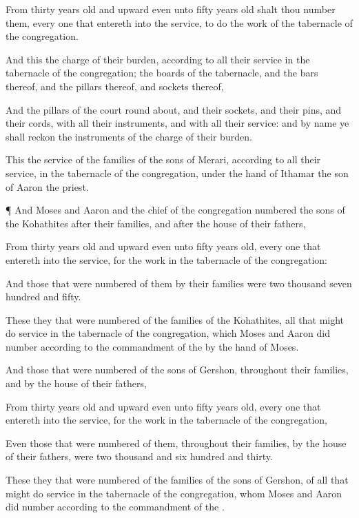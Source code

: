 {From
thirty
years
old and
upward even unto
fifty
years
old shalt thou
number them, every one that
entereth into the
service, to
do the
work of the
tabernacle of the
congregation.

And this
{} the
charge of their
burden, according to all their
service in the
tabernacle of the
congregation; the
boards of the
tabernacle, and the
bars thereof, and the
pillars thereof, and
sockets thereof,

And the
pillars of the
court round
about, and their
sockets, and their
pins, and their
cords, with all their
instruments, and with all their
service: and by
name ye shall
reckon the
instruments of the
charge of their
burden.

This
{} the
service of the
families of the
sons of
Merari, according to all their
service, in the
tabernacle of the
congregation, under the
hand of
Ithamar the
son of
Aaron the
priest.


\par }{\PP {}¶ And
Moses and
Aaron and the
chief of the
congregation
numbered the
sons of the
Kohathites after their
families, and after the
house of their
fathers,

From
thirty
years
old and
upward even unto
fifty
years
old, every one that
entereth into the
service, for the
work in the
tabernacle of the
congregation:

And those that were
numbered of them by their
families were two
thousand
seven
hundred and
fifty.

These
{} they that were
numbered of the
families of the
Kohathites, all that might do
service in the
tabernacle of the
congregation, which
Moses and
Aaron did
number according to the
commandment of the
{} by the
hand of
Moses.

And those that were
numbered of the
sons of
Gershon, throughout their
families, and by the
house of their
fathers,

From
thirty
years
old and
upward even unto
fifty
years
old, every one that
entereth into the
service, for the
work in the
tabernacle of the
congregation,

Even those that were
numbered of them, throughout their
families, by the
house of their
fathers, were two
thousand and
six
hundred and
thirty.

These
{} they that were
numbered of the
families of the
sons of
Gershon, of all that might do
service in the
tabernacle of the
congregation, whom
Moses and
Aaron did
number according to the
commandment of the
{}.


}
